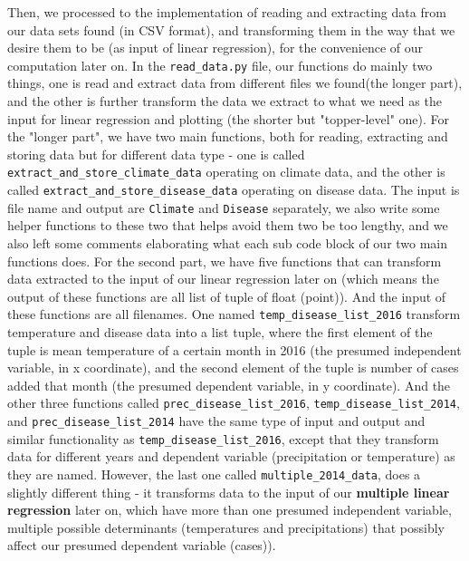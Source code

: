 \documentclass[fontsize=11pt]{article}
\begin{document}
Then, we processed to the implementation of reading and extracting data from our data sets found (in CSV format), and transforming them in the way that we desire them to be (as input of linear regression), for the convenience of our computation later on. In the \texttt{read\_data.py} file, our functions do mainly two things, one is read and extract data from different files we found(the longer part), and the other is further transform the data we extract to what we need as the input for linear regression and plotting (the shorter but "topper-level" one). For the "longer part", we have two main functions, both for reading, extracting and storing data but for different data type - one is called \texttt{extract\_and\_store\_climate\_data} operating on climate data, and the other is called \texttt{extract\_and\_store\_disease\_data} operating on disease data. The input is file name and output are \texttt{Climate} and \texttt{Disease} separately, we also write some helper functions to these two that helps avoid them two be too lengthy, and we also left some comments elaborating what each sub code block of our two main functions does. For the second part, we have five functions that can transform data extracted to the input of our linear regression later on (which means the output of these functions are all list of tuple of float (point)). And the input of these functions are all filenames. One named \texttt{temp\_disease\_list\_2016} transform temperature and disease data into a list tuple, where the first element of the tuple is mean temperature of a certain month in 2016 (the presumed independent variable, in x coordinate), and the second element of the tuple is number of cases added that month (the presumed dependent variable, in y coordinate). And the other three functions called \texttt{prec\_disease\_list\_2016}, \texttt{temp\_disease\_list\_2014},
and \texttt{prec\_disease\_list\_2014} 
have the same type of input and output and similar functionality as \texttt{temp\_disease\_list\_2016}, except that they transform data for different years and dependent variable (precipitation or temperature) as they are named. However, the last one called \texttt{multiple\_2014\_data}, does a slightly different thing - it transforms data to the input of our \textbf{multiple linear regression} later on, which have more than one presumed independent variable, multiple possible determinants (temperatures and precipitations) that possibly affect our presumed dependent variable (cases)). 
\end{document}
